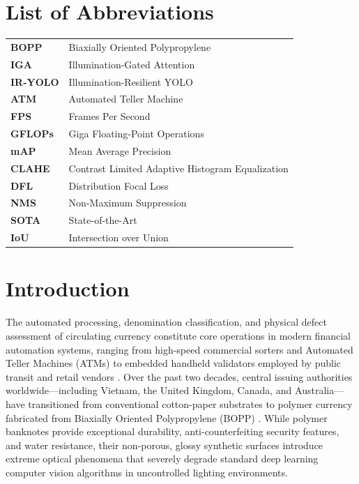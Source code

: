 \documentclass[twocolumn]{svjour3}
\begin{document}
\section*{List of Abbreviations}
\noindent
\begin{tabular}{@{}ll@{}}
\textbf{BOPP} & Biaxially Oriented Polypropylene \\
\textbf{IGA} & Illumination-Gated Attention \\
\textbf{IR-YOLO} & Illumination-Resilient YOLO \\
\textbf{ATM} & Automated Teller Machine \\
\textbf{FPS} & Frames Per Second \\
\textbf{GFLOPs} & Giga Floating-Point Operations \\
\textbf{mAP} & Mean Average Precision \\
\textbf{CLAHE} & Contrast Limited Adaptive Histogram Equalization \\
\textbf{DFL} & Distribution Focal Loss \\
\textbf{NMS} & Non-Maximum Suppression \\
\textbf{SOTA} & State-of-the-Art \\
\textbf{IoU} & Intersection over Union \\
\end{tabular}

\section{Introduction}
\label{sec:intro}

The automated processing, denomination classification, and physical defect assessment of circulating currency constitute core operations in modern financial automation systems, ranging from high-speed commercial sorters and Automated Teller Machines (ATMs) to embedded handheld validators employed by public transit and retail vendors \cite{khandokar2021banknote, pham2019vietnamese}. Over the past two decades, central issuing authorities worldwide—including Vietnam, the United Kingdom, Canada, and Australia—have transitioned from conventional cotton-paper substrates to polymer currency fabricated from Biaxially Oriented Polypropylene (BOPP) \cite{bopp2022banknote}. While polymer banknotes provide exceptional durability, anti-counterfeiting security features, and water resistance, their non-porous, glossy synthetic surfaces introduce extreme optical phenomena that severely degrade standard deep learning computer vision algorithms in uncontrolled lighting environments.
\end{document}
